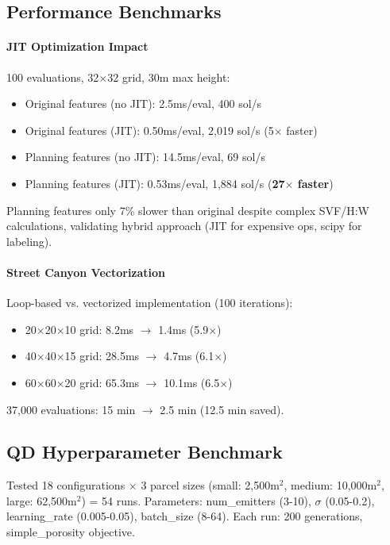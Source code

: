 \documentclass[times,final]{elsarticle}
\begin{document}
\subsection{Performance Benchmarks}

\paragraph{JIT Optimization Impact}
100 evaluations, 32$\times$32 grid, 30m max height:
\begin{itemize}
\item Original features (no JIT): 2.5ms/eval, 400 sol/s
\item Original features (JIT): 0.50ms/eval, 2,019 sol/s (5$\times$ faster)
\item Planning features (no JIT): 14.5ms/eval, 69 sol/s
\item Planning features (JIT): 0.53ms/eval, 1,884 sol/s (\textbf{27$\times$ faster})
\end{itemize}

Planning features only 7\% slower than original despite complex SVF/H:W calculations, validating hybrid approach (JIT for expensive ops, scipy for labeling).

\paragraph{Street Canyon Vectorization}
Loop-based vs. vectorized implementation (100 iterations):
\begin{itemize}
\item 20$\times$20$\times$10 grid: 8.2ms $\rightarrow$ 1.4ms (5.9$\times$)
\item 40$\times$40$\times$15 grid: 28.5ms $\rightarrow$ 4.7ms (6.1$\times$)
\item 60$\times$60$\times$20 grid: 65.3ms $\rightarrow$ 10.1ms (6.5$\times$)
\end{itemize}

37,000 evaluations: 15 min $\rightarrow$ 2.5 min (12.5 min saved).

\subsection{QD Hyperparameter Benchmark}
\label{sec:hyperparameters}

Tested 18 configurations $\times$ 3 parcel sizes (small: 2,500m$^2$, medium: 10,000m$^2$, large: 62,500m$^2$) = 54 runs. Parameters: num\_emitters (3-10), $\sigma$ (0.05-0.2), learning\_rate (0.005-0.05), batch\_size (8-64). Each run: 200 generations, simple\_porosity objective.
\end{document}
